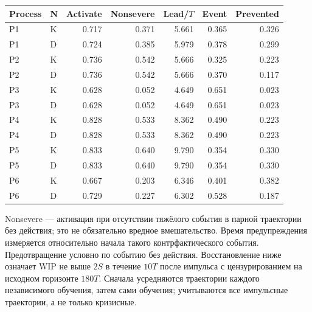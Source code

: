 \begin{center}\small\setlength{\tabcolsep}{4pt}\begin{tabular}{llrrrrr}\toprule

Process & N & Activate & Nonsevere & Lead/$T$ & Event & Prevented\\\midrule

P1 & K & 0.717 & 0.371 & 5.661 & 0.365 & 0.326\\

P1 & D & 0.724 & 0.385 & 5.979 & 0.378 & 0.299\\

P2 & K & 0.736 & 0.542 & 5.666 & 0.325 & 0.223\\

P2 & D & 0.736 & 0.542 & 5.666 & 0.370 & 0.117\\

P3 & K & 0.628 & 0.052 & 4.649 & 0.651 & 0.023\\

P3 & D & 0.628 & 0.052 & 4.649 & 0.651 & 0.023\\

P4 & K & 0.828 & 0.533 & 8.362 & 0.490 & 0.223\\

P4 & D & 0.828 & 0.533 & 8.362 & 0.490 & 0.223\\

P5 & K & 0.833 & 0.640 & 9.790 & 0.354 & 0.330\\

P5 & D & 0.833 & 0.640 & 9.790 & 0.354 & 0.330\\

P6 & K & 0.667 & 0.203 & 6.346 & 0.401 & 0.382\\

P6 & D & 0.729 & 0.227 & 6.302 & 0.528 & 0.187\\

\bottomrule\end{tabular}\end{center}

Nonsevere — активация при отсутствии тяжёлого события в парной траектории без действия; это не обязательно вредное вмешательство. Время предупреждения измеряется относительно начала такого контрфактического события. Предотвращение условно по событию без действия. Восстановление ниже означает WIP не выше $2S$ в течение $10T$ после импульса с цензурированием на исходном горизонте $180T$. Сначала усредняются траектории каждого независимого обучения, затем сами обучения; учитываются все импульсные траектории, а не только кризисные.

